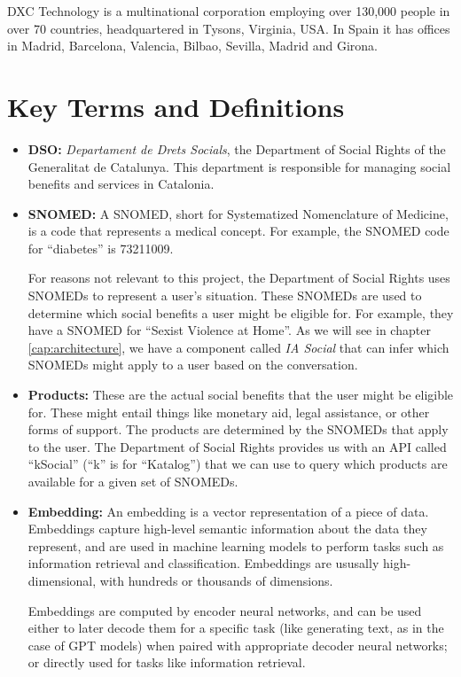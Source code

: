 \documentclass[a4paper,12pt,twoside]{ThesisStyle}
\begin{document}
DXC Technology is a multinational corporation employing over 130,000 people in over 70 countries, headquartered in Tysons, Virginia, USA. In Spain it has offices in Madrid, Barcelona, Valencia, Bilbao, Sevilla, Madrid and Girona.

\section{Key Terms and Definitions}
\label{sec:terms}

\begin{itemize}
  \item \textbf{DSO:} \textit{Departament de Drets Socials}, the Department of Social Rights of the Generalitat de Catalunya. This department is responsible for managing social benefits and services in Catalonia.
  \item \textbf{SNOMED:} A SNOMED, short for Systematized Nomenclature of Medicine, is a code that represents a medical concept. For example, the SNOMED code for ``diabetes'' is 73211009.
  
  For reasons not relevant to this project, the Department of Social Rights uses SNOMEDs to represent a user's situation. These SNOMEDs are used to determine which social benefits a user might be eligible for. For example, they have a SNOMED for ``Sexist Violence at Home''. As we will see in chapter \ref{cap:architecture}, we have a component called \textit{IA Social} that can infer which SNOMEDs might apply to a user based on the conversation.
  \item \textbf{Products:} These are the actual social benefits that the user might be eligible for. These might entail things like monetary aid, legal assistance, or other forms of support. The products are determined by the SNOMEDs that apply to the user. The Department of Social Rights provides us with an API called ``kSocial'' (``k'' is for ``Katalog'') that we can use to query which products are available for a given set of SNOMEDs.
  \item \textbf{Embedding:} An embedding is a vector representation of a piece of data. Embeddings capture high-level semantic information about the data they represent, and are used in machine learning models to perform tasks such as information retrieval and classification. Embeddings are ususally high-dimensional, with hundreds or thousands of dimensions.
  
  Embeddings are computed by encoder neural networks, and can be used either to later decode them for a specific task (like generating text, as in the case of GPT models) when paired with appropriate decoder neural networks; or directly used for tasks like information retrieval.
  

\end{itemize}
\end{document}
